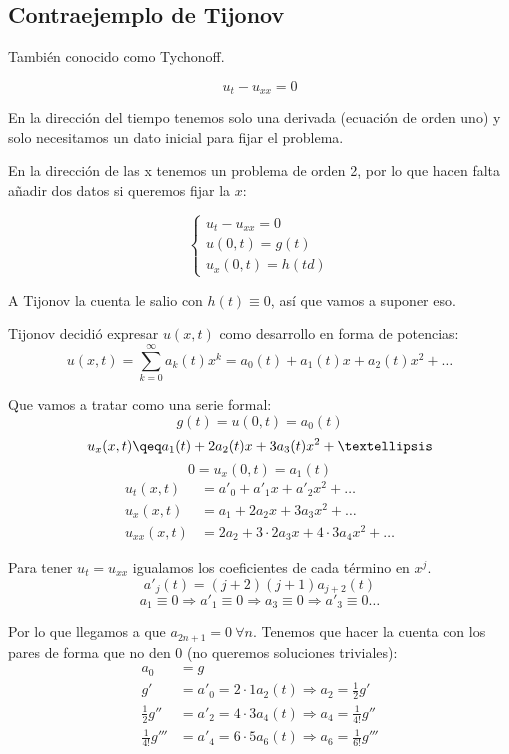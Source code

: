 
		\subsection{Contraejemplo de Tijonov}
			También conocido como Tychonoff.  %

			\[u_t - u_{xx} = 0\]

			En la dirección del tiempo tenemos solo una derivada (ecuación de orden uno) y solo necesitamos un dato inicial para fijar el problema.

			En la dirección de las x tenemos un problema de orden 2, por lo que hacen falta añadir dos datos si queremos fijar la $x$:

			\[\begin{cases}
				u_t-u_{xx} = 0 \\
				u(0,t) = g(t) \\
				u_x(0,t) = h(td)
			\end{cases}\]

			A Tijonov la cuenta le salio con $h(t)\equiv 0$, así que vamos a suponer eso.

			Tijonov decidió expresar $u(x,t)$ como desarrollo en forma de potencias: $$u(x,t) = \sum\limits_{k=0}^\infty a_k(t) x^k = a_0(t) + a_1(t)x + a_2(t)x^2 + …$$

			Que vamos a tratar como una serie formal:
			\[ g(t) = u(0,t) = a_0(t)\]
			\[ u_x(x,t) \qeq a_1(t) + 2a_2(t)x + 3a_3(t)x^2 + …\]
			\[ 0 = u_x(0,t) = a_1(t)\]
			\begin{align*}
				u_t(x,t) &= a'_0 + a'_1 x + a'_2x^2 + … \\
				u_x(x,t) &= a_1 + 2a_2x + 3a_3x^2 + … \\
				u_{xx}(x,t) &= 2a_2 + 3 \cdot 2 a_3 x + 4 \cdot 3 a_4 x^2 + …
			\end{align*}

			Para tener $u_t = u_{xx}$ igualamos los coeficientes de cada término en $x^j$.
			\[ a'_j(t) = (j+2)(j+1) a_{j+2} (t)\]
			\[a_1 \equiv 0 \Rightarrow a'_1 \equiv 0 \Rightarrow a_3 \equiv 0 \Rightarrow a'_3 \equiv 0 …\]

			Por lo que llegamos a que $a_{2n+1} = 0 \ \forall n$. Tenemos que hacer la cuenta con los pares de forma que no den 0 (no queremos soluciones triviales):
			\begin{align*}
				a_0 &= g \\
				g' &= a'_0 = 2 \cdot 1 a_2 (t) \Rightarrow a_2 = \frac{1}{2} g' \\
				\frac{1}{2}g'' &= a'_2 = 4 \cdot 3 a_4 (t) \Rightarrow a_4 = \frac{1}{4!} g'' \\
				\frac{1}{4!}g''' &= a'_4 = 6 \cdot 5 a_6 (t) \Rightarrow a_6 = \frac{1}{6!} g'''
			\end{align*}

